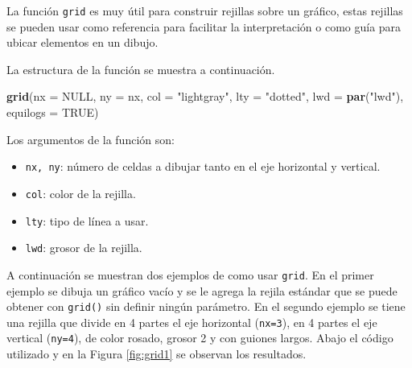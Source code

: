 \documentclass[10pt,]{krantz}
\makeatletter
\newenvironment{Shaded}{\begin{snugshade}}{\end{snugshade}}
\newcommand{\KeywordTok}[1]{\textcolor[rgb]{0.13,0.29,0.53}{\textbf{{#1}}}}
\newcommand{\DataTypeTok}[1]{\textcolor[rgb]{0.13,0.29,0.53}{{#1}}}
\newcommand{\StringTok}[1]{\textcolor[rgb]{0.31,0.60,0.02}{{#1}}}
\newcommand{\OtherTok}[1]{\textcolor[rgb]{0.56,0.35,0.01}{{#1}}}
\newcommand{\NormalTok}[1]{{#1}}
\providecommand{\tightlist}{%
  \setlength{\itemsep}{0pt}\setlength{\parskip}{0pt}}
\newenvironment{kframe}{%
\medskip{}
\setlength{\fboxsep}{.8em}
 \def\at@end@of@kframe{}%
 \ifinner\ifhmode%
  \def\at@end@of@kframe{\end{minipage}}%
  \begin{minipage}{\columnwidth}%
 \fi\fi%
 \def\FrameCommand##1{\hskip\@totalleftmargin \hskip-\fboxsep
 \colorbox{shadecolor}{##1}\hskip-\fboxsep
     \hskip-\linewidth \hskip-\@totalleftmargin \hskip\columnwidth}%
 \MakeFramed {\advance\hsize-\width
   \@totalleftmargin\z@ \linewidth\hsize
   \@setminipage}}%
 {\par\unskip\endMakeFramed%
 \at@end@of@kframe}
\renewenvironment{Shaded}{\begin{kframe}}{\end{kframe}}
\makeatother
\begin{document}
La función \texttt{grid} es muy útil para construir rejillas sobre un
gráfico, estas rejillas se pueden usar como referencia para facilitar la
interpretación o como guía para ubicar elementos en un dibujo.

La estructura de la función se muestra a continuación.

\begin{Shaded}
\begin{Highlighting}[]
\KeywordTok{grid}\NormalTok{(}\DataTypeTok{nx =} \OtherTok{NULL}\NormalTok{, }\DataTypeTok{ny =} \NormalTok{nx, }\DataTypeTok{col =} \StringTok{"lightgray"}\NormalTok{, }\DataTypeTok{lty =} \StringTok{"dotted"}\NormalTok{,}
     \DataTypeTok{lwd =} \KeywordTok{par}\NormalTok{(}\StringTok{"lwd"}\NormalTok{), }\DataTypeTok{equilogs =} \OtherTok{TRUE}\NormalTok{)}
\end{Highlighting}
\end{Shaded}

Los argumentos de la función son:

\begin{itemize}
\tightlist
\item
  \texttt{nx,\ ny}: número de celdas a dibujar tanto en el eje
  horizontal y vertical.
\item
  \texttt{col}: color de la rejilla.
\item
  \texttt{lty}: tipo de línea a usar.
\item
  \texttt{lwd}: grosor de la rejilla.
\end{itemize}

A continuación se muestran dos ejemplos de como usar \texttt{grid}. En
el primer ejemplo se dibuja un gráfico vacío y se le agrega la rejila
estándar que se puede obtener con \texttt{grid()} sin definir ningún
parámetro. En el segundo ejemplo se tiene una rejilla que divide en 4
partes el eje horizontal (\texttt{nx=3}), en 4 partes el eje vertical
(\texttt{ny=4}), de color rosado, grosor 2 y con guiones largos. Abajo
el código utilizado y en la Figura \ref{fig:grid1} se observan los
resultados.
\end{document}
